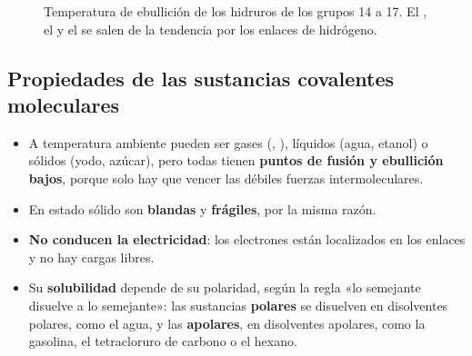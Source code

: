 \begin{figure}[H]
    \centering
    \caption{Temperatura de ebullición de los hidruros de los grupos 14 a 17. El , el  y el  se salen de
    la tendencia por los enlaces de hidrógeno.}
    \label{fig:ud4-hidruros}
\end{figure}

\subsection{Propiedades de las sustancias covalentes moleculares}

\begin{itemize}
    \item A temperatura ambiente pueden ser gases (, ), líquidos (agua, etanol) o sólidos (yodo, azúcar), pero todas
    tienen \textbf{puntos de fusión y ebullición bajos}, porque solo hay que vencer las débiles fuerzas intermoleculares.
    \item En estado sólido son \textbf{blandas} y \textbf{frágiles}, por la misma razón.
    \item \textbf{No conducen la electricidad}: los electrones están localizados en los enlaces y no hay cargas libres.
    \item Su \textbf{solubilidad} depende de su polaridad, según la regla «lo semejante disuelve a lo semejante»: las sustancias
    \textbf{polares} se disuelven en disolventes polares, como el agua, y las \textbf{apolares}, en disolventes apolares, como la
    gasolina, el tetracloruro de carbono o el hexano.
\end{itemize}

